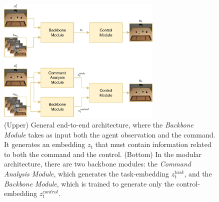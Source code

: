\begin{figure}[t]
    \centering
    \includegraphics[width=0.7\textwidth]{figures/images/ch3/end_to_end_vs_modular.jpg}
    \caption{(Upper) General end-to-end architecture, where the \textit{Backbone Module} takes as input both the agent observation and the command. It generates an embedding $z_{t}$ that must contain information related to both the command and the control. (Bottom) In the modular architecture, there are two backbone modules: the \textit{Command Analysis Module}, which generates the task-embedding $z^{task}_t$, and the \textit{Backbone Module}, which is trained to generate only the control-embedding $z^{control}_{t}$.}
    \label{fig:end_to_end_vs_modular}
\end{figure}
